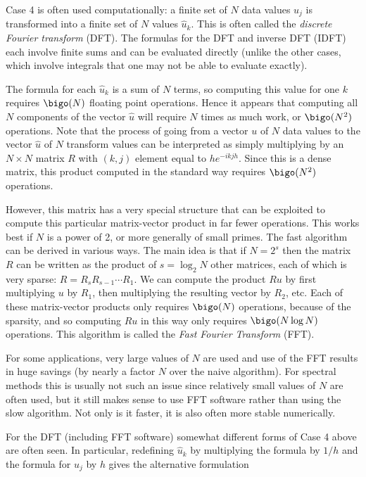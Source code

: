 \documentclass[11pt]{article}
\begin{document}
\vskip 10pt
\vskip 5pt
Case 4 is often used computationally:  a finite set of $N$ data values $u_j$
is transformed into a finite set of $N$ values $\hat u_k$.  
This is often called the {\em discrete Fourier transform} (DFT).  
The formulas for the DFT and inverse DFT (IDFT) each involve finite sums and
can be evaluated directly (unlike the other cases, which involve integrals
that one may not be able to evaluate exactly).

The formula for each $\hat u_k$ is a sum of $N$ terms, so 
computing this value for one $k$ requires $\bigo(N)$ floating point operations.
Hence it appears that computing all $N$ components of the vector $\hat u$ 
will require $N$ times as much work, or $\bigo(N^2)$ operations.
Note that the process of going from a vector $u$ of $N$ data values to the
vector $\hat u$ of $N$ transform values can be interpreted as simply
multiplying by an $N\times N$
matrix $R$ with $(k,j)$ element equal to $he^{-ikjh}$.
Since this is a dense matrix, this product computed in the standard way
requires $\bigo(N^2)$ operations.

However, this matrix has a very special structure that can be exploited to
compute this particular matrix-vector product in far fewer operations.
This works best if $N$ is a power of 2, or more generally of small primes.
The fast algorithm can be derived in various ways.  The main idea is that
if $N=2^s$ then the matrix $R$ can be written as the product of $s = \log_2
N$ other matrices, each of which is very sparse: $R = R_sR_{s-1}\cdots R_1$.
We can compute the product $Ru$ by first multiplying $u$ by $R_1$, then 
multiplying the resulting vector by
$R_2$, etc.  Each of these matrix-vector products only requires $\bigo(N)$
operations, because of the sparsity, and so computing $Ru$ in this way only
requires $\bigo(N\log N)$ operations.  This algorithm is called the {\em
Fast Fourier Transform} (FFT).

For some applications, very large values of $N$ are used and use of the FFT
results in huge savings (by nearly a factor $N$ over the naive algorithm).
For spectral methods this is usually not such an issue since relatively
small values of $N$ are often used, but it still makes sense to use FFT
software rather than using the slow algorithm.  Not only is it faster, it is
also often more stable numerically.

For the DFT (including FFT software) somewhat different forms of Case 4 above
are often seen.  In particular, redefining $\hat u_k$ by multiplying the 
formula  by $1/h$ and the formula  for $u_j$ by $h$ gives the
alternative formulation
\end{document}

